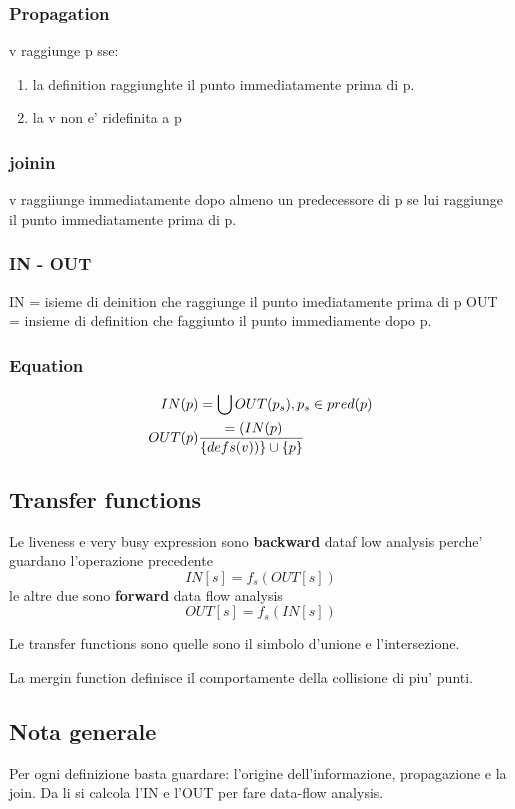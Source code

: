 \subsubsection{Propagation}
v raggiunge p sse:
\begin{enumerate}
\item la definition raggiunghte il punto immediatamente prima di p.
\item la v non e' ridefinita a p
\end{enumerate}
\subsubsection{joinin}
v raggiiunge immediatamente dopo almeno un predecessore di p se lui raggiunge
il punto immediatamente prima di p.
\subsubsection{IN - OUT}
IN = isieme di deinition che raggiunge il punto imediatamente prima di p
OUT = insieme di definition che faggiunto il punto immediamente dopo p.
\subsubsection{Equation}
\begin{align*}
  IN(p) &= \bigcup OUT(p_s),p_s \in pred(p) \\
  OUT(p) &= (IN(p) \over \{defs(v))\} \cup \{p\}
\end{align*}

\subsection{Transfer functions}
Le liveness e very busy expression sono \textbf{backward} dataf low analysis
perche' guardano l'operazione precedente
$$IN[s] = f_s(OUT[s])$$
le altre due sono \textbf{forward} data flow analysis
$$OUT[s] = f_s(IN[s])$$

Le transfer functions sono quelle sono il simbolo d'unione e l'intersezione.

La mergin function definisce il comportamente della collisione di piu' punti.



\subsection{Nota generale}
Per ogni definizione basta guardare: l'origine dell'informazione, propagazione
e la join. Da li si calcola l'IN e l'OUT per fare data-flow analysis.
